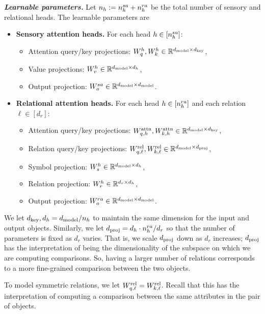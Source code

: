 \textit{\textbf{Learnable parameters.}} Let $n_h := n_h^{sa} + n_h^{ra}$ be the total number of sensory and relational heads. The learnable parameters are
\begin{itemize}[left=5pt]
    \item \textbf{Sensory attention heads.} For each head $h \in [n_h^{sa}]$:
    \begin{itemize}[label=$\circ$]
        \item Attention query/key projections: $W_q^h, W_k^h \in \mathbb{R}^{d_{\mathrm{model}} \times d_{\mathrm{key}}}$, 
        \item Value projections: $W_v^h \in \mathbb{R}^{d_{\mathrm{model}} \times d_h}$,
        \item Output projection: $W_o^{sa} \in \mathbb{R}^{d_{\mathrm{model}} \times d_{\mathrm{model}}}$.
    \end{itemize}
    \item \textbf{Relational attention heads.} For each head $h \in [n_h^{ra}]$ and each relation $\ell \in [d_r]$:
    \begin{itemize}[label=$\circ$]
        \item Attention query/key projections: $W_{q, h}^{\mathrm{attn}}, W_{k, h}^{\mathrm{attn}} \in \mathbb{R}^{d_{\mathrm{model}} \times d_{\mathrm{key}}}$,
        \item Relation query/key projections: $W_{q, \ell}^{\mathrm{rel}}, W_{k, \ell}^{\mathrm{rel}} \in \mathbb{R}^{d_{\mathrm{model}} \times d_{\mathrm{proj}}}$,
        \item Symbol projection: $W_s^h \in \mathbb{R}^{d_{\mathrm{model}} \times d_h}$,
        \item Relation projection: $W_r^h \in \mathbb{R}^{d_r \times d_h}$,
        \item Output projection: $W_o^{ra} \in \mathbb{R}^{d_{\mathrm{model}} \times d_{\mathrm{model}}}$.
    \end{itemize}
\end{itemize}
We let $d_{\mathrm{key}}, d_h = d_{\mathrm{model}} / n_h$ to maintain the same dimension for the input and output objects. Similarly, we let $d_{\mathrm{proj}} = d_h \cdot n_h^{ra} / d_r$ so that the number of parameters is fixed as $d_r$ varies. That is, we scale $d_{\mathrm{proj}}$ down as $d_r$ increases; $d_{\mathrm{proj}}$ has the interpretation of being the dimensionality of the subspace on which we are computing comparisons. So, having a larger number of relations corresponds to a more fine-grained comparison between the two objects.

To model symmetric relations, we let $W_{q, \ell}^{\mathrm{rel}} = W_{k, \ell}^{\mathrm{rel}}$. Recall that this has the interpretation of computing a comparison between the same attributes in the pair of objects.

